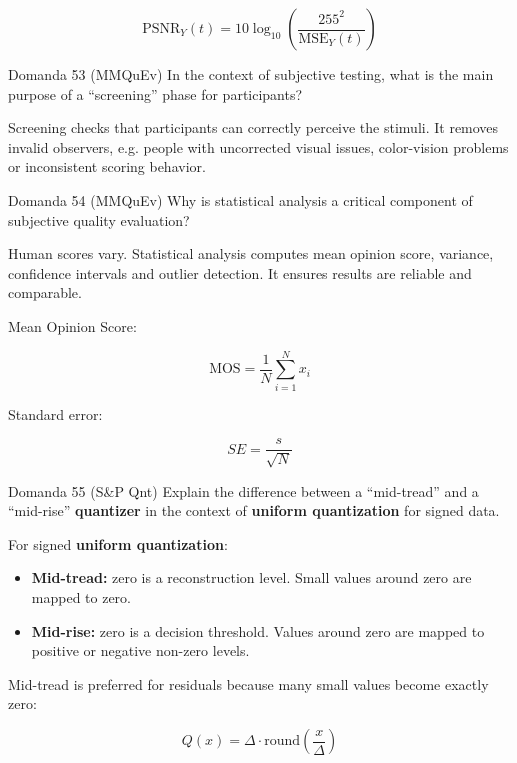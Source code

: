 $$
\text{PSNR}_Y(t)=10\log_{10}\left(\frac{255^2}{\text{MSE}_Y(t)}\right)
$$




\begin{questionbox}{Domanda 53}
(MMQuEv) In the context of subjective testing, what is the main purpose of a “screening” phase for participants?
\end{questionbox}


Screening checks that participants can correctly perceive the stimuli. It removes invalid observers, e.g. people with uncorrected visual issues, color-vision problems or inconsistent scoring behavior.



\begin{questionbox}{Domanda 54}
(MMQuEv) Why is statistical analysis a critical component of subjective quality evaluation?
\end{questionbox}


Human scores vary. Statistical analysis computes mean opinion score, variance, confidence intervals and outlier detection. It ensures results are reliable and comparable.

Mean Opinion Score:


$$
\text{MOS}=\frac{1}{N}\sum_{i=1}^{N}x_i
$$


Standard error:


$$
SE=\frac{s}{\sqrt{N}}
$$




\begin{questionbox}{Domanda 55}
(S\&P Qnt) Explain the difference between a “mid-tread” and a “mid-rise” \textbf{quantizer} in the context of \textbf{uniform \textbf{quantization}} for signed data.
\end{questionbox}


For signed \textbf{uniform \textbf{quantization}}:

\begin{itemize}
  \item \textbf{Mid-tread:} zero is a reconstruction level. Small values around zero are mapped to zero.
  \item \textbf{Mid-rise:} zero is a decision threshold. Values around zero are mapped to positive or negative non-zero levels.
\end{itemize}

Mid-tread is preferred for residuals because many small values become exactly zero:


$$
Q(x)=\Delta\cdot\text{round}\left(\frac{x}{\Delta}\right)
$$


